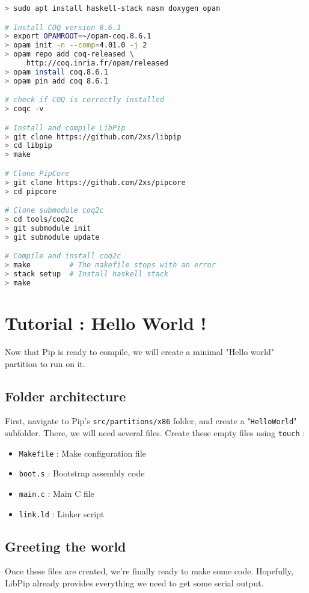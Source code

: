\documentclass[10pt,a4paper,titlepage]{refart}
\begin{document}
\begin{lstlisting}[language=bash]
> sudo apt install haskell-stack nasm doxygen opam

# Install COQ version 8.6.1
> export OPAMROOT=~/opam-coq.8.6.1
> opam init -n --comp=4.01.0 -j 2
> opam repo add coq-released \
     http://coq.inria.fr/opam/released
> opam install coq.8.6.1
> opam pin add coq 8.6.1

# check if COQ is correctly installed
> coqc -v

# Install and compile LibPip
> git clone https://github.com/2xs/libpip
> cd libpip
> make

# Clone PipCore
> git clone https://github.com/2xs/pipcore
> cd pipcore

# Clone submodule coq2c
> cd tools/coq2c
> git submodule init 
> git submodule update

# Compile and install coq2c 
> make         # The makefile stops with an error
> stack setup  # Install haskell stack
> make 
\end{lstlisting}

\section{Tutorial : Hello World !}
Now that Pip is ready to compile, we will create a minimal "Hello world" partition to run on it.

\subsection{Folder architecture}
First, navigate to Pip's \texttt{src/partitions/x86} folder, and create a "\texttt{HelloWorld}" subfolder.
There, we will need several files. Create these empty files using \texttt{touch} :
\begin{itemize}
\item \texttt{Makefile} : Make configuration file
\item \texttt{boot.s} : Bootstrap assembly code
\item \texttt{main.c} : Main C file
\item \texttt{link.ld} : Linker script
\end{itemize}

\subsection{Greeting the world}
Once these files are created, we're finally ready to make some code. Hopefully, LibPip already provides everything we need to get some serial output.
\end{document}

